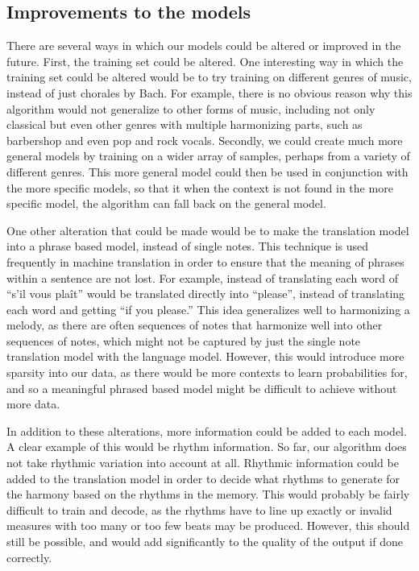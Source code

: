 \documentclass{sig-alternate}
\begin{document}
\subsection{Improvements to the models}
There are several ways in which our models could be altered or improved in the future. First, the training set could be altered. One interesting way in which the training set could be altered would be to try training on different genres of music, instead of just chorales by Bach. For example, there is no obvious reason why this algorithm would not generalize to other forms of music, including not only classical but even other genres with multiple harmonizing parts, such as barbershop and even pop and rock vocals. Secondly, we could create much more general models by training on a wider array of samples, perhaps from a variety of different genres. This more general model could then be used in conjunction with the more specific models, so that it when the context is not found in the more specific model, the algorithm can fall back on the general model.

One other alteration that could be made would be to make the translation model into a phrase based model, instead of single notes. This technique is used frequently in machine translation in order to ensure that the meaning of phrases within a sentence are not lost. For example, instead of translating each word of ``s'il vous pla\^{i}t'' would be translated directly into ``please'', instead of translating each word and getting ``if you please.'' This idea generalizes well to harmonizing a melody, as there are often sequences of notes that harmonize well into other sequences of notes, which might not be captured by just the single note translation model with the language model. However, this would introduce more sparsity into our data, as there would be more contexts to learn probabilities for, and so a meaningful phrased based model might be difficult to achieve without more data.

In addition to these alterations, more information could be added to each model. A clear example of this would be rhythm information. So far, our algorithm does not take rhythmic variation into account at all. Rhythmic information could be added to the translation model in order to decide what rhythms to generate for the harmony based on the rhythms in the memory. This would probably be fairly difficult to train and decode, as the rhythms have to line up exactly or invalid measures with too many or too few beats may be produced. However, this should still be possible, and would add significantly to the quality of the output if done correctly.
\label{sec:remaining_work}



\appendix
\label{app}
\end{document}
